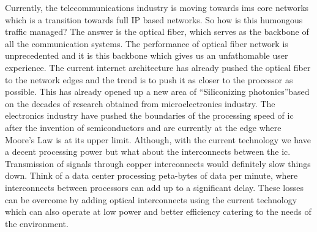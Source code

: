 \documentclass[../report.tex]{subfiles}
\begin{document}
Currently, the telecommunications industry is moving towards \gls{ims} core networks which is a transition towards full IP based networks. So how is this humongous traffic managed? The answer is the optical fiber, which serves as the backbone of all the communication systems. The performance of optical fiber network is unprecedented and it is this backbone which gives us an unfathomable user experience. The current internet architecture has already pushed the optical fiber to the network edges and the trend is to push it as closer to the processor as possible. This has already opened up a new area of \textquotedblleft Siliconizing photonics\textquotedblright  based on the decades of research obtained from microelectronics industry. The electronics industry have pushed the boundaries of the processing speed of \gls{ic} after the invention of semiconductors and are currently at the edge where Moore’s Law is at its upper limit. Although, with the current technology we have a decent processing power but what about the interconnects between the \gls{ic}. Transmission of signals through copper interconnects would definitely slow things down. Think of a data center processing peta-bytes of data per minute, where interconnects between processors can add up to a significant delay. These losses can be overcome by adding optical interconnects using the current technology which can also operate at low power and better efficiency catering to the needs of the environment.  
	
\end{document}
